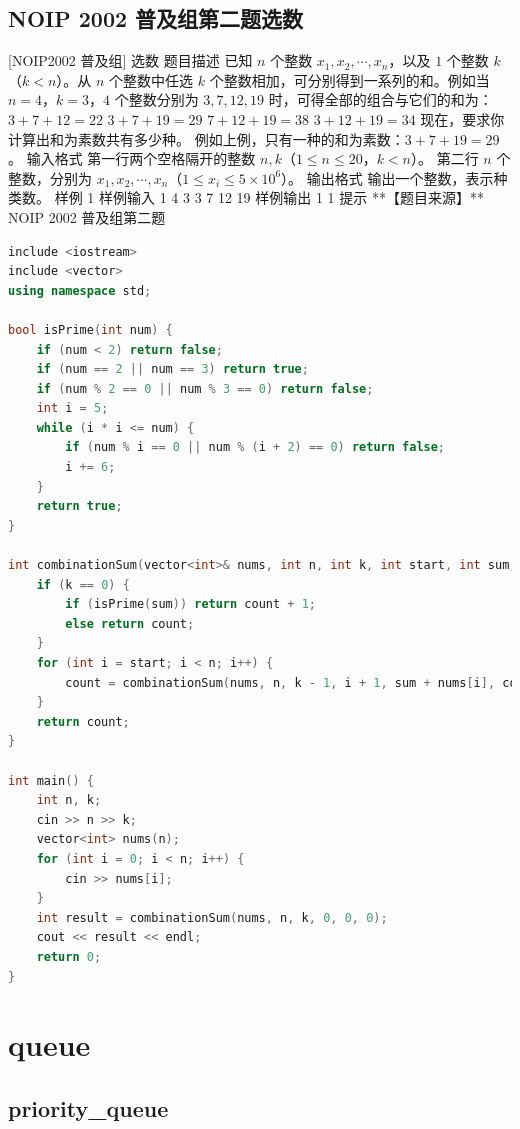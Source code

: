 \documentclass[12pt,twiside,a4paper]{ctexbook}
\numberwithin{chapter}{part}
\begin{document}
\section{NOIP 2002 普及组第二题选数}
 [NOIP2002 普及组] 选数
 题目描述
已知 $n$ 个整数 $x_1,x_2,\cdots,x_n$，以及 $1$ 个整数 $k$（$k<n$）。从 $n$ 个整数中任选 $k$ 个整数相加，可分别得到一系列的和。例如当 $n=4$，$k=3$，$4$ 个整数分别为 $3,7,12,19$ 时，可得全部的组合与它们的和为：
$3+7+12=22$
$3+7+19=29$
$7+12+19=38$
$3+12+19=34$
现在，要求你计算出和为素数共有多少种。
例如上例，只有一种的和为素数：$3+7+19=29$。
 输入格式
第一行两个空格隔开的整数 $n,k$（$1 \le n \le 20$，$k<n$）。
第二行 $n$ 个整数，分别为 $x_1,x_2,\cdots,x_n$（$1 \le x_i \le 5\times 10^6$）。
 输出格式
输出一个整数，表示种类数。
 样例 1
 样例输入 1
4 3
3 7 12 19
 样例输出 1
1
 提示
**【题目来源】**
NOIP 2002 普及组第二题
\begin{lstlisting}[language=c++,breaklines=true]
include <iostream>
include <vector>
using namespace std;

bool isPrime(int num) {
    if (num < 2) return false;
    if (num == 2 || num == 3) return true;
    if (num % 2 == 0 || num % 3 == 0) return false;
    int i = 5;
    while (i * i <= num) {
        if (num % i == 0 || num % (i + 2) == 0) return false;
        i += 6;
    }
    return true;
}

int combinationSum(vector<int>& nums, int n, int k, int start, int sum, int count) {
    if (k == 0) {
        if (isPrime(sum)) return count + 1;
        else return count;
    }
    for (int i = start; i < n; i++) {
        count = combinationSum(nums, n, k - 1, i + 1, sum + nums[i], count);
    }
    return count;
}

int main() {
    int n, k;
    cin >> n >> k;
    vector<int> nums(n);
    for (int i = 0; i < n; i++) {
        cin >> nums[i];
    }
    int result = combinationSum(nums, n, k, 0, 0, 0);
    cout << result << endl;
    return 0;
}
\end{lstlisting}

\chapter{queue}
\section{priority\_queue}
\end{document}
